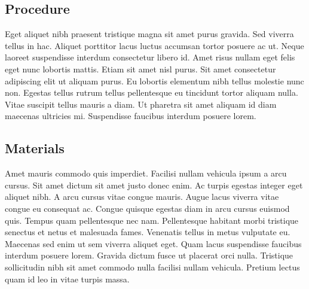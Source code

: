 \documentclass[letterpaper,\myfontsize]{article}
\begin{document}

\subsection{Procedure}

Eget aliquet nibh praesent tristique magna sit amet purus gravida. Sed viverra tellus in hac. Aliquet porttitor lacus luctus accumsan tortor posuere ac ut. Neque laoreet suspendisse interdum consectetur libero id. Amet risus nullam eget felis eget nunc lobortis mattis. Etiam sit amet nisl purus. Sit amet consectetur adipiscing elit ut aliquam purus. Eu lobortis elementum nibh tellus molestie nunc non. Egestas tellus rutrum tellus pellentesque eu tincidunt tortor aliquam nulla. Vitae suscipit tellus mauris a diam. Ut pharetra sit amet aliquam id diam maecenas ultricies mi. Suspendisse faucibus interdum posuere lorem.


\subsection{Materials}

Amet mauris commodo quis imperdiet. Facilisi nullam vehicula ipsum a arcu cursus. Sit amet dictum sit amet justo donec enim. Ac turpis egestas integer eget aliquet nibh. A arcu cursus vitae congue mauris. Augue lacus viverra vitae congue eu consequat ac. Congue quisque egestas diam in arcu cursus euismod quis. Tempus quam pellentesque nec nam. Pellentesque habitant morbi tristique senectus et netus et malesuada fames. Venenatis tellus in metus vulputate eu. Maecenas sed enim ut sem viverra aliquet eget. Quam lacus suspendisse faucibus interdum posuere lorem. Gravida dictum fusce ut placerat orci nulla. Tristique sollicitudin nibh sit amet commodo nulla facilisi nullam vehicula. Pretium lectus quam id leo in vitae turpis massa.
\end{document}
